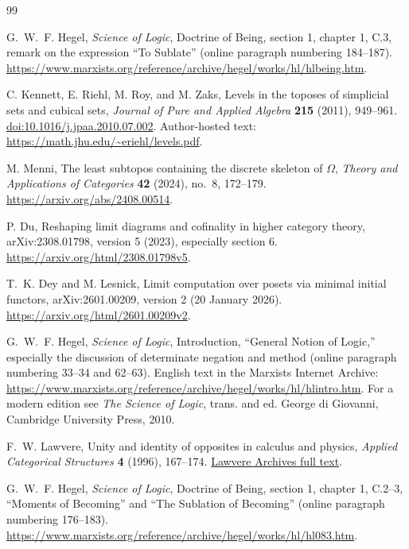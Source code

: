 \begingroup
\small\raggedright
\begin{thebibliography}{99}

G.~W.~F. Hegel, \emph{Science of Logic}, Doctrine of Being, section 1,
chapter 1, C.3, remark on the expression ``To Sublate'' (online
paragraph numbering 184--187).
\url{https://www.marxists.org/reference/archive/hegel/works/hl/hlbeing.htm}.

C. Kennett, E. Riehl, M. Roy, and M. Zaks, Levels in the toposes of
simplicial sets and cubical sets, \emph{Journal of Pure and Applied
Algebra} \textbf{215} (2011), 949--961.
\href{https://doi.org/10.1016/j.jpaa.2010.07.002}{doi:10.1016/j.jpaa.2010.07.002}.
Author-hosted text: \url{https://math.jhu.edu/~eriehl/levels.pdf}.

M. Menni, The least subtopos containing the discrete skeleton of
$\Omega$, \emph{Theory and Applications of Categories} \textbf{42}
(2024), no.~8, 172--179.
\url{https://arxiv.org/abs/2408.00514}.

P. Du, Reshaping limit diagrams and cofinality in higher category
theory, arXiv:2308.01798, version 5 (2023), especially section 6.
\url{https://arxiv.org/html/2308.01798v5}.

T.~K. Dey and M. Lesnick, Limit computation over posets via minimal
initial functors, arXiv:2601.00209, version 2 (20 January 2026).
\url{https://arxiv.org/html/2601.00209v2}.

G.~W.~F. Hegel, \emph{Science of Logic}, Introduction, ``General Notion
of Logic,'' especially the discussion of determinate negation and method
(online paragraph numbering 33--34 and 62--63). English text in the
Marxists Internet Archive:
\url{https://www.marxists.org/reference/archive/hegel/works/hl/hlintro.htm}.
For a modern edition see \emph{The Science of Logic}, trans. and ed.
George di Giovanni, Cambridge University Press, 2010.

F.~W. Lawvere, Unity and identity of opposites in calculus and physics,
\emph{Applied Categorical Structures} \textbf{4} (1996), 167--174.
\href{https://lawverearchives.com/wp-content/uploads/2024/12/1996-unity-and-identity-of-opposites-in-calculus-and-physics.pdf}{Lawvere Archives full text}.

G.~W.~F. Hegel, \emph{Science of Logic}, Doctrine of Being, section 1,
chapter 1, C.2--3, ``Moments of Becoming'' and ``The Sublation of
Becoming'' (online paragraph numbering 176--183).
\url{https://www.marxists.org/reference/archive/hegel/works/hl/hl083.htm}.


\end{thebibliography}
